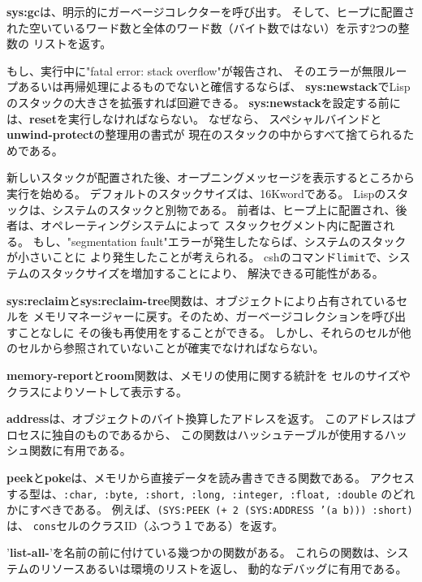 {\bf sys:gc}は、明示的にガーベージコレクターを呼び出す。
そして、ヒープに配置された空いているワード数と全体のワード数（バイト数ではない）を示す2つの整数の
リストを返す。

もし、実行中に"fatal error: stack overflow"が報告され、
そのエラーが無限ループあるいは再帰処理によるものでないと確信するならば、
{\bf sys:newstack}でLispのスタックの大きさを拡張すれば回避できる。
{\bf sys:newstack}を設定する前には、{\bf reset}を実行しなければならない。
なぜなら、
スペシャルバインドと{\bf unwind-protect}の整理用の書式が
現在のスタックの中からすべて捨てられるためである。

新しいスタックが配置された後、オープニングメッセージを表示するところから
実行を始める。
デフォルトのスタックサイズは、16Kwordである。
Lispのスタックは、システムのスタックと別物である。
前者は、ヒープ上に配置され、後者は、オペレーティングシステムによって
スタックセグメント内に配置される。
もし、"segmentation fault"エラーが発生したならば、システムのスタックが小さいことに
より発生したことが考えられる。
cshのコマンド{\tt limit}で、システムのスタックサイズを増加することにより、
解決できる可能性がある。

{\bf sys:reclaim}と{\bf sys:reclaim-tree}関数は、オブジェクトにより占有されているセルを
メモリマネージャーに戻す。そのため、ガーベージコレクションを呼び出すことなしに
その後も再使用をすることができる。
しかし、それらのセルが他のセルから参照されていないことが確実でなければならない。

{\bf memory-report}と{\bf room}関数は、メモリの使用に関する統計を
セルのサイズやクラスによりソートして表示する。

{\bf address}は、オブジェクトのバイト換算したアドレスを返す。
このアドレスはプロセスに独自のものであるから、
この関数はハッシュテーブルが使用するハッシュ関数に有用である。

{\bf peek}と{\bf poke}は、メモリから直接データを読み書きできる関数である。
アクセスする型は、{\tt :char, :byte, :short, :long, :integer, :float, :double}
のどれかにすべきである。
例えば、{\tt (SYS:PEEK (+ 2 (SYS:ADDRESS '(a b))) :short)}は、
{\tt cons}セルのクラスID（ふつう１である）を返す。

'{\bf list-all-}'を名前の前に付けている幾つかの関数がある。
これらの関数は、システムのリソースあるいは環境のリストを返し、
動的なデバッグに有用である。

